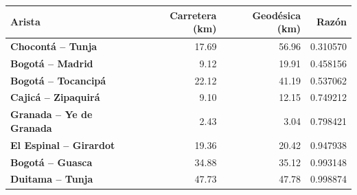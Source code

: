 \renewcommand{\arraystretch}{1.2}
\begin{tabular}{|l|r|r|r|}
\hline
\rowcolor{gray!20} \textbf{Arista} & \textbf{Carretera (km)} & \textbf{Geodésica (km)} & \textbf{Razón} \\
\hline
\textbf{Chocontá -- Tunja} & 17.69 & 56.96 & 0.310570 \\
\hline
\textbf{Bogotá -- Madrid} & 9.12 & 19.91 & 0.458156 \\
\hline
\textbf{Bogotá -- Tocancipá} & 22.12 & 41.19 & 0.537062 \\
\hline
\textbf{Cajicá -- Zipaquirá} & 9.10 & 12.15 & 0.749212 \\
\hline
\textbf{Granada -- Ye de Granada} & 2.43 & 3.04 & 0.798421 \\
\hline
\textbf{El Espinal -- Girardot} & 19.36 & 20.42 & 0.947938 \\
\hline
\textbf{Bogotá -- Guasca} & 34.88 & 35.12 & 0.993148 \\
\hline
\textbf{Duitama -- Tunja} & 47.73 & 47.78 & 0.998874 \\
\hline
\end{tabular}
